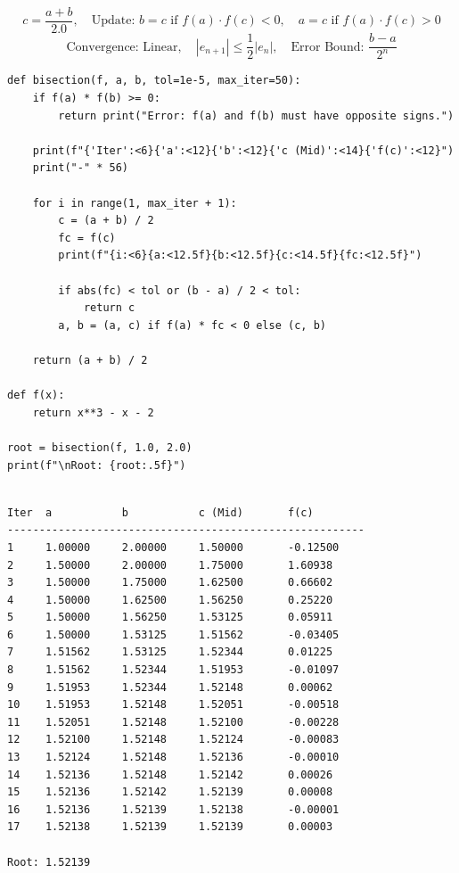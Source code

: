 \documentclass[10pt,a4paper]{report}
\begin{document}
\begin{tcolorbox}[colback=theorybg,colframe=theoryframe,title=\textbf{Mathematical Theory \& Formulation},boxrule=1pt,arc=2mm]
\[
c = \frac{a + b}{2.0}, \quad \text{Update: } b = c \text{ if } f(a) \cdot f(c) < 0, \quad a = c \text{ if } f(a) \cdot f(c) > 0
\]
\[
\text{Convergence: Linear}, \quad |e_{n+1}| \le \frac{1}{2}|e_n|, \quad \text{Error Bound: } \frac{b - a}{2^n}
\]
\end{tcolorbox}

\begin{tcolorbox}[colback=codebg,colframe=secondary,title=\textbf{Python Implementation (Step-by-Step Functions)},boxrule=1pt,arc=2mm]
\begin{lstlisting}[style=python_detailed]
def bisection(f, a, b, tol=1e-5, max_iter=50):
    if f(a) * f(b) >= 0:
        return print("Error: f(a) and f(b) must have opposite signs.")

    print(f"{'Iter':<6}{'a':<12}{'b':<12}{'c (Mid)':<14}{'f(c)':<12}")
    print("-" * 56)

    for i in range(1, max_iter + 1):
        c = (a + b) / 2
        fc = f(c)
        print(f"{i:<6}{a:<12.5f}{b:<12.5f}{c:<14.5f}{fc:<12.5f}")

        if abs(fc) < tol or (b - a) / 2 < tol:
            return c
        a, b = (a, c) if f(a) * fc < 0 else (c, b)

    return (a + b) / 2

def f(x):
    return x**3 - x - 2

root = bisection(f, 1.0, 2.0)
print(f"\nRoot: {root:.5f}")


\end{lstlisting}
\end{tcolorbox}

\begin{tcolorbox}[colback=termbg,colframe=primary,title=\textbf{Program Execution Output \& Convergence Table},boxrule=1pt,arc=2mm]
\begin{lstlisting}[style=terminal_output]
Iter  a           b           c (Mid)       f(c)        
--------------------------------------------------------
1     1.00000     2.00000     1.50000       -0.12500    
2     1.50000     2.00000     1.75000       1.60938     
3     1.50000     1.75000     1.62500       0.66602     
4     1.50000     1.62500     1.56250       0.25220     
5     1.50000     1.56250     1.53125       0.05911     
6     1.50000     1.53125     1.51562       -0.03405    
7     1.51562     1.53125     1.52344       0.01225     
8     1.51562     1.52344     1.51953       -0.01097    
9     1.51953     1.52344     1.52148       0.00062     
10    1.51953     1.52148     1.52051       -0.00518    
11    1.52051     1.52148     1.52100       -0.00228    
12    1.52100     1.52148     1.52124       -0.00083    
13    1.52124     1.52148     1.52136       -0.00010    
14    1.52136     1.52148     1.52142       0.00026     
15    1.52136     1.52142     1.52139       0.00008     
16    1.52136     1.52139     1.52138       -0.00001    
17    1.52138     1.52139     1.52139       0.00003     

Root: 1.52139
\end{lstlisting}
\end{tcolorbox}
\end{document}
